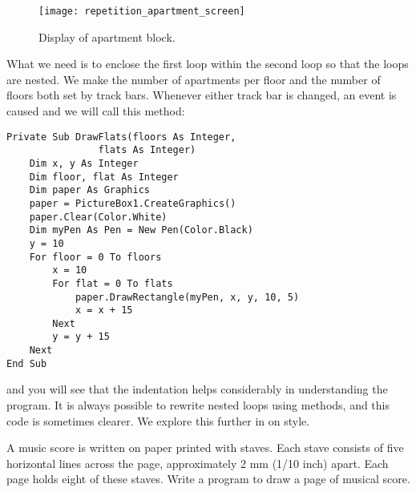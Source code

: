 		\begin{figure}[bth]
			\centering
			\texttt{[image: repetition\_apartment\_screen]}
			\caption{Display of apartment block.}
			\label{fig:repetition_apartment_screen}
		\end{figure}

		What we need is to enclose the first loop within the second loop so that the loops are nested. We make the number of apartments per floor and the number of floors both set by track bars. Whenever either track bar is changed, an event is caused and we will call this method:
		\begin{lstlisting}
Private Sub DrawFlats(floors As Integer,
				flats As Integer)
	Dim x, y As Integer
	Dim floor, flat As Integer
	Dim paper As Graphics
	paper = PictureBox1.CreateGraphics()
	paper.Clear(Color.White)
	Dim myPen As Pen = New Pen(Color.Black)
	y = 10
	For floor = 0 To floors
		x = 10
		For flat = 0 To flats
			paper.DrawRectangle(myPen, x, y, 10, 5)
			x = x + 15
		Next
		y = y + 15
	Next
End Sub
		\end{lstlisting}
		and you will see that the indentation helps considerably in understanding the program. It is always possible to rewrite nested loops using methods, and this code is sometimes clearer. We explore this further in  on style.

		\begin{stqb}
			\begin{STQ}
				\item A music score is written on paper printed with staves. Each stave consists of five horizontal lines across the page, approximately 2 mm (1/10 inch) apart. Each page holds eight of these staves. Write a program to draw a page of musical score.
			\end{STQ}
		\end{stqb}


